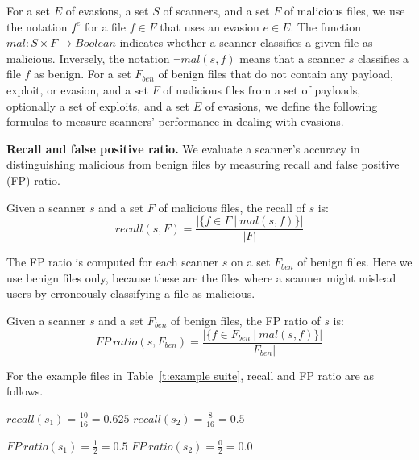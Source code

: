 For a  set $E$ of evasions, a set $S$ of scanners, and a set $F$ of malicious files, 
we use the notation $f^e$ for a file $f \in F$ that uses an evasion $e \in E$.
The function $\mathit{mal}: S \times F \rightarrow \mathit{Boolean}$  indicates whether a scanner classifies a given file as malicious.
Inversely, the notation $\neg \mathit{mal}(s,f)$ means that a scanner $s$ classifies a file $f$ as benign.
For a set $F_{ben}$ of benign files that do not contain any payload, exploit, or evasion, and a set $F$ of malicious files from a set of payloads,
optionally a set of exploits,
and a set $E$ of evasions,
we define the following formulas to measure scanners' performance in dealing with evasions.

\textbf{Recall and false positive ratio.}
We evaluate a scanner's accuracy in distinguishing malicious from benign files by measuring recall and false positive (FP) ratio.

\begin{definition}[Recall]
Given a scanner $s$ and a set $F$ of malicious files, the recall of $s$ is:
$$
\mathit{recall}(s, F) = \frac{|\{ f \in F ~|~ \mathit{mal}(s,f) \}|}{|F|}
$$
\label{def: recall}
\end{definition}
%
The FP ratio is computed for each scanner $s$ on a set $F_{ben}$ of benign files.
Here we use benign files only, because these are the files where a scanner might mislead users by erroneously classifying a file as malicious.
%
\begin{definition}[FP ratio]
Given a scanner $s$ and a set $F_{ben}$ of benign files, the FP ratio of $s$ is:
$$
\mathit{FP~ratio}(s, F_{ben}) = \frac{|\{ f \in F_{ben} ~|~ \mathit{mal}(s,f) \}|}{|F_{ben}|}
$$
\label{def: fp ratio}
\end{definition}

For the example files in Table~\ref{t:example suite}, recall and FP ratio are as follows.

\vspace{.5em}
{
\centering
$recall(s_1) = \frac{10}{16} = 0.625$ \hspace{2em} $recall(s_2) = \frac{8}{16} = 0.5$ \\
}
\vspace{.5em}

\vspace{.5em}
{
\centering
$FP~ratio(s_1) = \frac{1}{2} = 0.5$ \hspace{2em} $FP~ratio(s_2) = \frac{0}{2} = 0.0$\\
}
\vspace{.5em}

